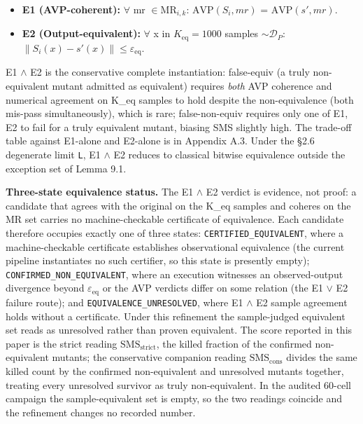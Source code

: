 \documentclass[manuscript,screen,review]{acmart}
\begin{document}
\begin{itemize}

\item
  \textbf{E1 (AVP-coherent):} $\forall$ mr $\in \mathrm{MR}_{i,k}$: $\mathrm{AVP}(S_i, mr)$ =
  $\mathrm{AVP}(s', mr)$.
\item
  \textbf{E2 (Output-equivalent):} $\forall$ x in $K_{\mathrm{eq}}=1000$ samples
  $\sim \mathcal{D}_P$: $\|S_i(x) - s'(x)\| \leq \varepsilon_{\mathrm{eq}}$.
\end{itemize}

E1 $\wedge$ E2 is the conservative complete instantiation: false-equiv (a
truly non-equivalent mutant admitted as equivalent) requires \emph{both}
AVP coherence and numerical agreement on K\_eq samples to hold despite the
non-equivalence (both mis-pass simultaneously), which is rare;
false-non-equiv requires only one of E1, E2 to fail for a truly equivalent
mutant, biasing SMS slightly high. The trade-off table against
E1-alone and E2-alone is in Appendix A.3. Under the §2.6 degenerate
limit \texttt{L}, E1 $\wedge$ E2 reduces to classical bitwise equivalence
outside the exception set of Lemma 9.1.

\textbf{Three-state equivalence status.} The E1 $\wedge$ E2 verdict is
evidence, not proof: a candidate that agrees with the original on the
K\_eq samples and coheres on the MR set carries no machine-checkable
certificate of equivalence. Each candidate therefore occupies exactly one
of three states: \texttt{CERTIFIED\_EQUIVALENT}, where a machine-checkable
certificate establishes observational equivalence (the current pipeline
instantiates no such certifier, so this state is presently empty);
\texttt{CONFIRMED\_NON\_EQUIVALENT}, where an execution witnesses an
observed-output divergence beyond $\varepsilon_{\mathrm{eq}}$ or the AVP
verdicts differ on some relation (the E1 $\vee$ E2 failure route); and
\texttt{EQUIVALENCE\_UNRESOLVED}, where E1 $\wedge$ E2 sample agreement
holds without a certificate. Under this refinement the sample-judged
equivalent set reads as unresolved rather than proven equivalent. The
score reported in this paper is the strict reading
$\mathrm{SMS}_{\mathrm{strict}}$, the killed fraction of the confirmed
non-equivalent mutants; the conservative companion reading
$\mathrm{SMS}_{\mathrm{cons}}$ divides the same killed count by the
confirmed non-equivalent and unresolved mutants together, treating every
unresolved survivor as truly non-equivalent. In the audited 60-cell
campaign the sample-equivalent set is empty, so the two readings coincide
and the refinement changes no recorded number.
\end{document}
